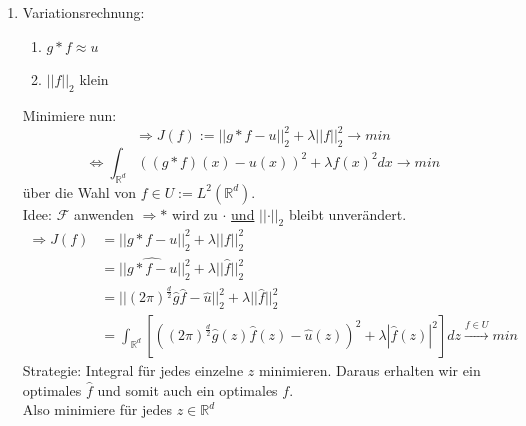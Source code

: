\documentclass{article}
\theoremstyle{plain}
\theoremstyle{definition}
\numberwithin{equation}{section}
\newcommand{\norm}[1] {
\left|\left| #1 \right|\right|
}
\newcommand{\R}[0] {
\mathbb R
}
\newcommand{\F}[0]{
    \mathcal F
}
\newcommand{\C}[0]{
    \cdot
}
\begin{document}
\begin{enumerate}[label = \arabic*. Ansatz:]
\begin{minipage}[c]{0.4\textwidth}
\begin{center}
                        \end{center}
                    \end{minipage}
                    \item Variationsrechnung:
                        \begin{enumerate}[label = \arabic*. Wunsch:]
                            \item $g *f \approx u$
                            \item $\norm{f}_2$ klein
                        \end{enumerate}
                        Minimiere nun:
                        \[\Rightarrow J(f) := \norm{g * f - u}_2^2 + \lambda \norm{f}_2^2 \to min\]
                        \[\iff \int_{\R^d} ((g*f)(x) - u(x))^2 + \lambda f(x)^2 dx \to min\]
                        über die Wahl von $f \in U:= L^2(\R^d)$.\\
                        Idee: $\F$ anwenden $\Rightarrow *$ wird zu $\C$ \underline{und} $\norm{\C}_2$ bleibt unverändert.
                        \begin{align*}
                            \Rightarrow J(f)&=\norm{g*f-u}_2^2 + \lambda\norm{f}_2^2\\
                            &=||\widehat{g*f-u}||_2^2 + \lambda ||\hat f||_2^2\\
                            &=||(2 \pi)^\frac{d}{2} \hat g \hat f -\hat u||_2^2 + \lambda||\hat f||_2^2\\
                            &=\int_{\R^d}\left[ \left((2 \pi)^\frac{d}{2} \hat g(z) \hat f(z) - \hat u(z)\right)^2 + \lambda |\hat f(z)|^2 \right] dz \overset{f \in U}{\longrightarrow} min
                        \end{align*}
                    Strategie: Integral für jedes einzelne $z$ minimieren. Daraus erhalten wir ein optimales $\hat f$ und somit auch ein optimales $f$.\\
                    Also minimiere für jedes $z \in \R^d$

\end{enumerate}
\end{document}
